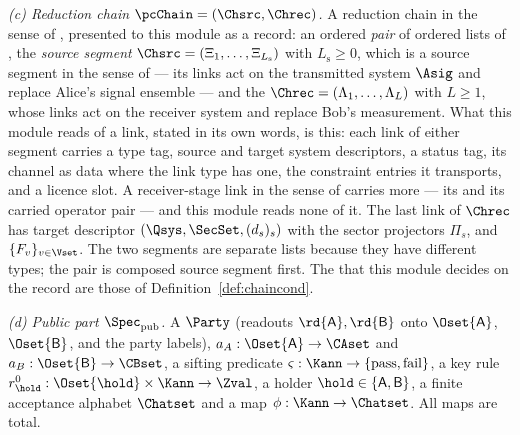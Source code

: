 \begin{definition}
\emph{(c) Reduction chain $\pcChain=(\Chsrc,\Chrec)$.} A reduction chain in
the sense of , presented to this module as a
record: an ordered \emph{pair} of ordered lists of , the
\emph{source segment} $\Chsrc=(\Xi_1,\dots,\Xi_{L_{\mathrm s}})$ with
$L_{\mathrm s}\ge0$, which is a source segment in the sense of
 --- its links act on the transmitted
system $\Asig$ and replace Alice's signal ensemble --- and the \emph{} $\Chrec=(\Lambda_1,\dots,\Lambda_L)$ with $L\ge1$, whose links act on
the receiver system and replace Bob's measurement. What this module reads of a
link, stated in its own words, is this: each link of either segment carries a
type tag, source and target system descriptors, a status tag, its channel as
data where the link type has one, the constraint entries it transports, and a
licence slot. A receiver-stage link in the sense of
 carries more --- its  and
its carried operator pair --- and this module reads none of it. The last link
of $\Chrec$ has target descriptor $(\Qsys,\SecSet,(d_s)_s)$ with the
sector projectors $\Pi_s$, and  $\{F_v\}_{v\in\Vset}$. The two
segments are separate lists because they have different types; the pair is
composed source segment first. The  that
this module decides on the record are those of
Definition~\ref{def:chaincond}.

\emph{(d) Public part $\Spec_{\mathrm{pub}}$.} A 
$\Party$ (readouts $\rd{\mathsf A},\rd{\mathsf B}$ onto $\Oset{\mathsf A}$,
$\Oset{\mathsf B}$, and the party labels), 
$a_A:\Oset{\mathsf A}\to\CAset$ and $a_B:\Oset{\mathsf B}\to\CBset$, a sifting
predicate $\varsigma:\Kann\to\{\mathrm{pass},\mathrm{fail}\}$, a key rule
$r_{\hold}^{0}:\Oset{\hold}\times\Kann\to\Zval$, a holder
$\hold\in\{\mathsf A,\mathsf B\}$, a finite acceptance alphabet $\Chatset$ and
a map $\phi:\Kann\to\Chatset$. All maps are total.


\end{definition}
